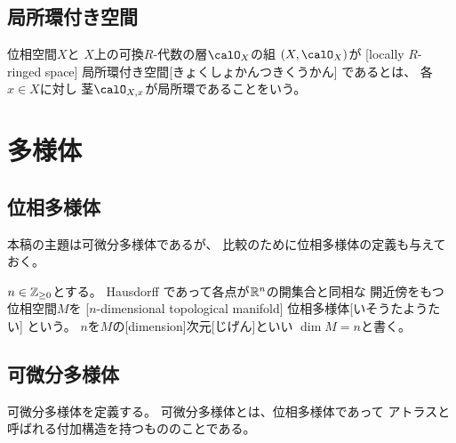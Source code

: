 \documentclass[report]{jlreq}
\begin{document}
\section{局所環付き空間}

\begin{definition}[局所環付き空間]
    位相空間$X$と
    $X$上の可換$R$-代数の層$\calO_X$の組
    $(X, \calO_X)$が
    [locally $R$-ringed space]
        {局所環付き空間}[きょくしょかんつきくうかん]
    であるとは、
    各$x \in X$に対し
    茎$\calO_{X, x}$が局所環であることをいう。
\end{definition}


%
\newpage
\chapter{多様体}

%
\section{位相多様体}

本稿の主題は可微分多様体であるが、
比較のために位相多様体の定義も与えておく。

\begin{definition}[位相多様体]
    $n \in \mathbb{Z}_{\ge 0}$とする。
    Hausdorff であって各点が$\mathbb{R}^n$の開集合と同相な
    開近傍をもつ位相空間$M$を
    [$n$-dimensional topological manifold]
        {位相多様体}[いそうたようたい]
    という。
    $n$を$M$の[dimension]{次元}[じげん]といい
    $\dim M = n$と書く。
\end{definition}

%
\section{可微分多様体}

可微分多様体を定義する。
可微分多様体とは、位相多様体であって
アトラスと呼ばれる付加構造を持つもののことである。

\end{document}

